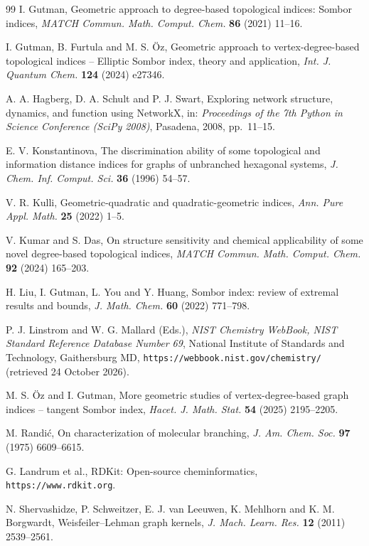 \documentclass[11pt,a4paper]{article}
\theoremstyle{plain}
\theoremstyle{definition}
\theoremstyle{remark}
\begin{document}
\begin{thebibliography}{99}
I. Gutman, Geometric approach to degree-based topological indices: Sombor
indices, \emph{MATCH Commun. Math. Comput. Chem.} \textbf{86} (2021) 11--16.

I. Gutman, B. Furtula and M. S. \"Oz, Geometric approach to vertex-degree-based
topological indices -- Elliptic Sombor index, theory and application,
\emph{Int. J. Quantum Chem.} \textbf{124} (2024) e27346.

A. A. Hagberg, D. A. Schult and P. J. Swart, Exploring network structure,
dynamics, and function using NetworkX, in: \emph{Proceedings of the 7th Python in
Science Conference (SciPy 2008)}, Pasadena, 2008, pp.\ 11--15.

E. V. Konstantinova, The discrimination ability of some topological and
information distance indices for graphs of unbranched hexagonal systems,
\emph{J. Chem. Inf. Comput. Sci.} \textbf{36} (1996) 54--57.

V. R. Kulli, Geometric-quadratic and quadratic-geometric indices,
\emph{Ann. Pure Appl. Math.} \textbf{25} (2022) 1--5.

V. Kumar and S. Das, On structure sensitivity and chemical applicability of some
novel degree-based topological indices,
\emph{MATCH Commun. Math. Comput. Chem.} \textbf{92} (2024) 165--203.

H. Liu, I. Gutman, L. You and Y. Huang, Sombor index: review of extremal results
and bounds, \emph{J. Math. Chem.} \textbf{60} (2022) 771--798.

P. J. Linstrom and W. G. Mallard (Eds.), \emph{NIST Chemistry WebBook, NIST
Standard Reference Database Number 69}, National Institute of Standards and
Technology, Gaithersburg MD, \texttt{https://webbook.nist.gov/chemistry/}
(retrieved 24 October 2026).

M. S. \"Oz and I. Gutman, More geometric studies of vertex-degree-based graph
indices -- tangent Sombor index,
\emph{Hacet. J. Math. Stat.} \textbf{54} (2025) 2195--2205.

M. Randi\'c, On characterization of molecular branching,
\emph{J. Am. Chem. Soc.} \textbf{97} (1975) 6609--6615.

G. Landrum et al., RDKit: Open-source cheminformatics,
\texttt{https://www.rdkit.org}.

N. Shervashidze, P. Schweitzer, E. J. van Leeuwen, K. Mehlhorn and
K. M. Borgwardt, Weisfeiler--Lehman graph kernels,
\emph{J. Mach. Learn. Res.} \textbf{12} (2011) 2539--2561.


\end{thebibliography}
\end{document}
